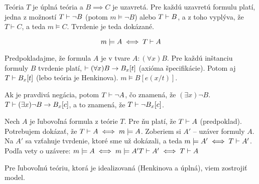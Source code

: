 Teória $T$ je úplná teória a $B \implies C$ je uzavretá. Pre každú uzavretú
formulu platí, jedna z možností $T \vdash \neg B$ (potom $m \models \neg B$)
alebo $T \vdash B$, a z toho vyplýva, že $T \vdash C$, a teda $m \models C$.
Tvrdenie je teda dokázané.

\begin{equation}
    m \models A \iff T \vdash A
\end{equation}

\par Predpokladajme, že formula $A$ je v tvare $A: (\forall x) B$. Pre každú
inštanciu formuly $B$ tvrdenie platí, $\vdash (\forall x) B \rightarrow B_x[t]$
(axióma špecifikácie). Potom aj $T \vdash B_x[t]$ (lebo teória je Henkinova). $m \models B[e(x/t)]$.

\par Ak je pravdivá negácia, potom $T \vdash \neg A$, čo znamená, že $(\exists
x) \neg B$. $T \vdash (\exists x) \neg B \rightarrow B_x[c]$, a to znamená, že $T
\vdash \neg B_x[c]$.

\par Nech $A$ je ľubovoľná formula z teórie $T$. Pre ňu platí, že $T \vdash A$
(predpoklad). Potrebujem dokázať, že $T \vdash A \iff m \models A$. Zoberiem si
$A'$ -- uzáver formuly $A$. Na $A'$ sa vzťahuje tvrdenie, ktoré sme už dokázali,
a teda $m \models A' \iff T \vdash A'$. Podľa vety o uzávere:
$m \models A \iff  m\models A' T \vdash A' \iff T \vdash A$

\par Pre ľubovoľnú teóriu, ktorá je idealizovaná (Henkinova a úplná), viem
zostrojiť model.

